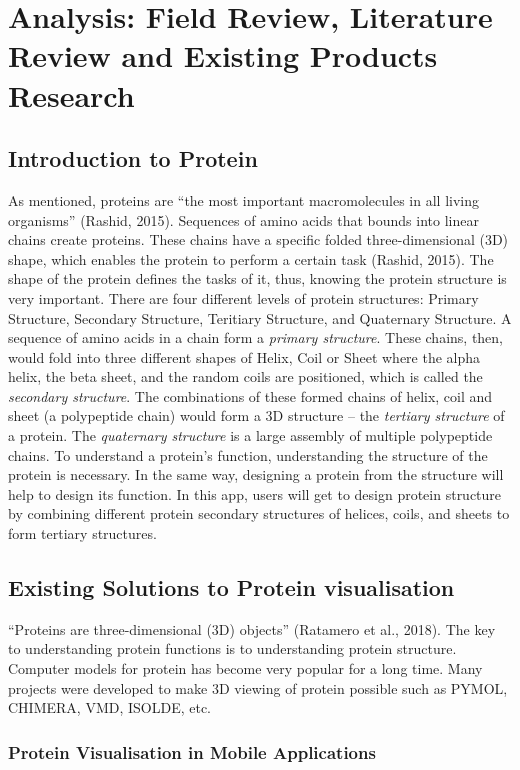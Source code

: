 \chapter{Analysis: Field Review, Literature Review and Existing Products Research}
\label{ch:litRev}

\section{Introduction to Protein}

As mentioned, proteins are “the most important macromolecules in all living organisms” (Rashid, 2015). Sequences of amino acids that bounds into linear chains create proteins. These chains have a specific folded three-dimensional (3D) shape, which enables the protein to perform a certain task (Rashid, 2015). The shape of the protein defines the tasks of it, thus, knowing the protein structure is very important. There are four different levels of protein structures: Primary Structure, Secondary Structure, Teritiary Structure, and Quaternary Structure. A sequence of amino acids in a chain form a \emph{primary structure}. These chains, then, would fold into three different shapes of Helix, Coil or Sheet where the alpha helix, the beta sheet, and the random coils are positioned, which is called the \emph{secondary structure}. The combinations of these formed chains of helix, coil and sheet (a polypeptide chain) would form a 3D structure – the \emph{tertiary structure} of a protein. The \emph {quaternary structure} is a large assembly of multiple polypeptide chains.
To understand a protein’s function, understanding the structure of the protein is necessary. In the same way, designing a protein from the structure will help to design its function. 
In this app, users will get to design protein structure by combining different protein secondary structures of helices, coils, and sheets to form tertiary structures. 


\section{Existing Solutions to Protein visualisation}
 “Proteins are three-dimensional (3D) objects” (Ratamero et al., 2018). The key to understanding protein functions is to understanding protein structure. Computer models for protein has become very popular for a long time. Many projects were developed to make 3D viewing of protein possible such as PYMOL, CHIMERA, VMD, ISOLDE, etc. 
 
 \subsection{Protein Visualisation in Mobile Applications}

